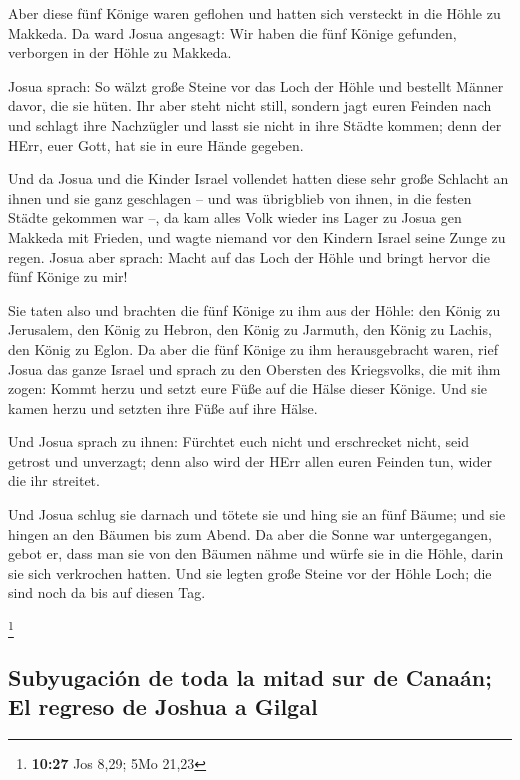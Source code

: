  Aber diese fünf Könige waren geflohen und hatten sich
versteckt in die Höhle zu Makkeda.  Da ward Josua
angesagt: Wir haben die fünf Könige gefunden, verborgen in der Höhle zu
Makkeda.

 Josua sprach: So wälzt große Steine vor das Loch der
Höhle und bestellt Männer davor, die sie hüten.  Ihr aber
steht nicht still, sondern jagt euren Feinden nach und schlagt ihre
Nachzügler und lasst sie nicht in ihre Städte kommen; denn der HErr,
euer Gott, hat sie in eure Hände gegeben.

 Und da Josua und die Kinder Israel vollendet hatten
diese sehr große Schlacht an ihnen und sie ganz geschlagen -- und was
übrigblieb von ihnen, in die festen Städte gekommen war --,
 da kam alles Volk wieder ins Lager zu Josua gen Makkeda
mit Frieden, und wagte niemand vor den Kindern Israel seine Zunge zu
regen.  Josua aber sprach: Macht auf das Loch der Höhle
und bringt hervor die fünf Könige zu mir!

 Sie taten also und brachten die fünf Könige zu ihm aus
der Höhle: den König zu Jerusalem, den König zu Hebron, den König zu
Jarmuth, den König zu Lachis, den König zu Eglon.  Da
aber die fünf Könige zu ihm herausgebracht waren, rief Josua das ganze
Israel und sprach zu den Obersten des Kriegsvolks, die mit ihm zogen:
Kommt herzu und setzt eure Füße auf die Hälse dieser Könige. Und sie
kamen herzu und setzten ihre Füße auf ihre Hälse.

 Und Josua sprach zu ihnen: Fürchtet euch nicht und
erschrecket nicht, seid getrost und unverzagt; denn also wird der HErr
allen euren Feinden tun, wider die ihr streitet.

 Und Josua schlug sie darnach und tötete sie und hing sie
an fünf Bäume; und sie hingen an den Bäumen bis zum Abend.
 Da aber die Sonne war untergegangen, gebot er, dass man
sie von den Bäumen nähme und würfe sie in die Höhle, darin sie sich
verkrochen hatten. Und sie legten große Steine vor der Höhle Loch; die
sind noch da bis auf diesen Tag.

\footnote{\textbf{10:27} Jos 8,29; 5Mo 21,23}

\hypertarget{subyugaciuxf3n-de-toda-la-mitad-sur-de-canauxe1n-el-regreso-de-joshua-a-gilgal}{%
\subsection{Subyugación de toda la mitad sur de Canaán; El regreso de
Joshua a
Gilgal}\label{subyugaciuxf3n-de-toda-la-mitad-sur-de-canauxe1n-el-regreso-de-joshua-a-gilgal}}

